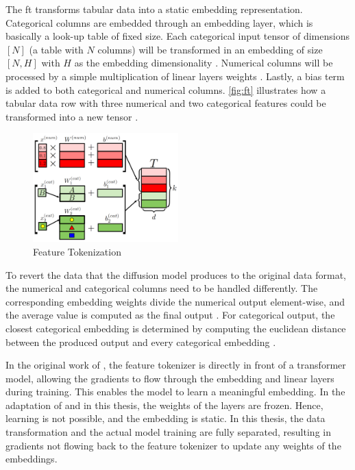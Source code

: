 The \gls{ft} transforms tabular data into a static embedding representation.
Categorical columns are embedded through an embedding layer, which is basically a look-up table \cite{pytorch2023EmbeddingPyTorch13} of fixed size.
Each categorical input tensor of dimensions $[N]$ (\ie a table with $N$ columns) will be transformed in an embedding of size $[N,H]$ with $H$ as the embedding dimensionality \cite{gorishniy2021RevisitingDeepLearning}.
Numerical columns will be processed by a simple multiplication of linear layers weights \cite{gorishniy2021RevisitingDeepLearning}.
Lastly, a bias term is added to both categorical and numerical columns.
\autoref{fig:ft} illustrates how a tabular data row with three numerical and two categorical features could be transformed into a new tensor \cite[Figure 2a, p.4]{gorishniy2021RevisitingDeepLearning}.

\begin{figure}[h]
	\centering
	\includegraphics[width=0.5\textwidth]{images/ft.png}
	\caption[Feature Tokenization]{Feature Tokenization \cite[Figure 2a, p.4]{gorishniy2021RevisitingDeepLearning}}
	\label{fig:ft}
\end{figure}

To revert the data that the diffusion model produces to the original data format, the numerical and categorical columns need to be handled differently.
The corresponding embedding weights divide the numerical output element-wise, and the average value is computed as the final output \cite{zheng2022DiffusionModelsMissing}.
For categorical output, the closest categorical embedding is determined by computing the euclidean distance between the produced output and every categorical embedding \cite{zheng2022DiffusionModelsMissing}.

In the original work of \cite{gorishniy2021RevisitingDeepLearning}, the feature tokenizer is directly in front of a transformer model, allowing the gradients to flow through the embedding and linear layers during training.
This enables the model to learn a meaningful embedding.
In the adaptation of \cite{zheng2023DiffusionModelsMissing} and in this thesis, the weights of the layers are frozen.
Hence, learning is not possible, and the embedding is static.
In this thesis, the data transformation and the actual model training are fully separated,
resulting in gradients not flowing back to the feature tokenizer to update any weights of the embeddings.

